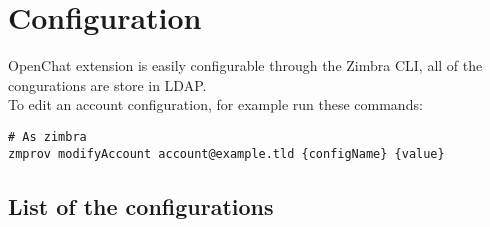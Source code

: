 \chapter{Configuration}

OpenChat extension is easily configurable through the Zimbra CLI, all of the congurations are store in LDAP.\\

\noindent To edit an account configuration, for example run these commands:
\begin{verbatim}
# As zimbra
zmprov modifyAccount account@example.tld {configName} {value}
\end{verbatim}

\section{List of the configurations}
